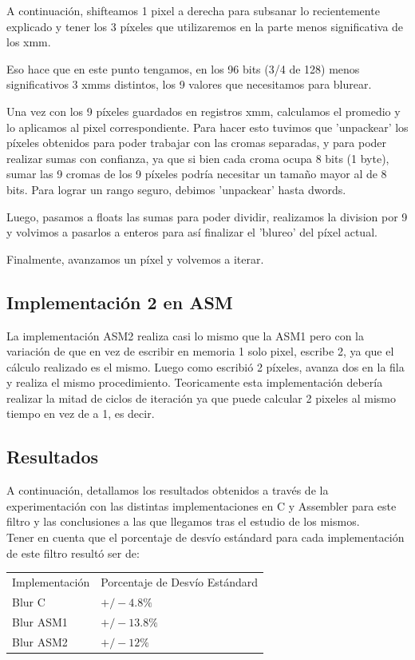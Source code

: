 A continuación, shifteamos 1 pixel a derecha para subsanar lo recientemente explicado y tener los 3 píxeles que utilizaremos en la parte menos significativa de los xmm.

Eso hace que en este punto tengamos, en los 96 bits (3/4 de 128) menos significativos 3 xmms distintos, los 9 valores que necesitamos para blurear.

Una vez con los 9 píxeles guardados en registros xmm, calculamos el promedio y lo aplicamos al pixel correspondiente. Para hacer esto tuvimos que 'unpackear' los píxeles obtenidos para poder trabajar con las cromas separadas, y para poder realizar sumas con confianza, ya que si bien cada croma ocupa 8 bits (1 byte), sumar las 9 cromas de los 9 píxeles podría necesitar un tamaño mayor al de 8 bits. Para lograr un rango seguro, debimos 'unpackear' hasta dwords.

Luego, pasamos a floats las sumas para poder dividir, realizamos la division por 9 y volvimos a pasarlos a enteros para así finalizar el 'blureo' del píxel actual.

Finalmente, avanzamos un píxel y volvemos a iterar.\\

\subsection{Implementación 2 en ASM}
La implementación ASM2 realiza casi lo mismo que la ASM1 pero con la variación de que en vez de escribir en memoria 1 solo pixel, escribe 2, ya que el cálculo realizado es el mismo. Luego como escribió 2 píxeles, avanza dos en la fila y realiza el mismo procedimiento. Teoricamente esta implementación debería realizar la mitad de ciclos de iteración ya que puede calcular 2 pixeles al mismo tiempo en vez de a 1, es decir.


\subsection{Resultados}
A continuación, detallamos los resultados obtenidos a través de la experimentación con las distintas implementaciones en C y Assembler para este filtro y las conclusiones a las que llegamos tras el estudio de los mismos.\\
Tener en cuenta que el porcentaje de desvío estándard para cada implementación de este filtro resultó ser de:
\begin{tabular}{| l | l |}
\hline
Implementación & Porcentaje de Desvío Estándard \\
Blur C  & $+/- 4.8\%$\\
Blur ASM1 &   $+/- 13.8\%$\\
Blur ASM2 & $+/- 12\%$\\
\hline
\end{tabular}

